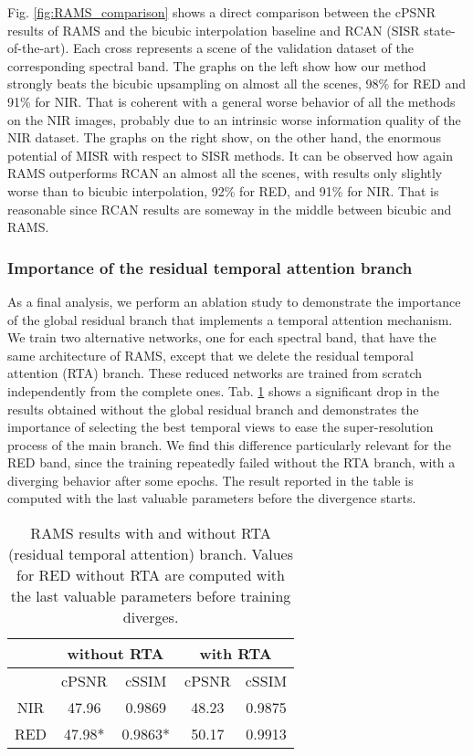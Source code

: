 \documentclass[journal]{IEEEtran}
\begin{document}
Fig. \ref{fig:RAMS_comparison} shows a direct comparison between the cPSNR results of RAMS and the bicubic interpolation baseline and RCAN (SISR state-of-the-art). Each cross represents a scene of the validation dataset of the corresponding spectral band. The graphs on the left show how our method strongly beats the bicubic upsampling on almost all the scenes, 98\% for RED and 91\% for NIR. That is coherent with a general worse behavior of all the methods on the NIR images, probably due to an intrinsic worse information quality of the NIR dataset. The graphs on the right show, on the other hand, the enormous potential of MISR with respect to SISR methods. It can be observed how again RAMS outperforms RCAN an almost all the scenes, with results only slightly worse than to bicubic interpolation, 92\% for RED, and 91\% for NIR. That is reasonable since RCAN results are someway in the middle between bicubic and RAMS. 

\subsubsection{Importance of the residual temporal attention branch}

As a final analysis, we perform an ablation study to demonstrate the importance of the global residual branch that implements a temporal attention mechanism. We train two alternative networks, one for each spectral band, that have the same architecture of RAMS, except that we delete the residual temporal attention (RTA) branch. These reduced networks are trained from scratch independently from the complete ones. Tab. \ref{tab:ablation} shows a significant drop in the results obtained without the global residual branch and demonstrates the importance of selecting the best temporal views to ease the super-resolution process of the main branch. We find this difference particularly relevant for the RED band, since the training repeatedly failed without the RTA branch, with a diverging behavior after some epochs. The result reported in the table is computed with the last valuable parameters before the divergence starts.

\begin{table}[]
\centering
\begin{tabular}{c|cc|cc}
     & \multicolumn{2}{c|}{without RTA} & \multicolumn{2}{c}{\textbf{with RTA}} \\ \hline
     & cPSNR       & cSSIM       & cPSNR      & cSSIM      \\ \hline\hline
NIR  & 47.96\;\;   & 0.9869\;\;  & 48.23      & 0.9875     \\
RED  & 47.98*      & 0.9863*     & 50.17      & 0.9913     \\
\end{tabular}
\caption{RAMS results with and without RTA (residual temporal attention) branch. Values for RED without RTA are computed with the last valuable parameters before training diverges.}
\label{tab:ablation}
\end{table}
\end{document}
